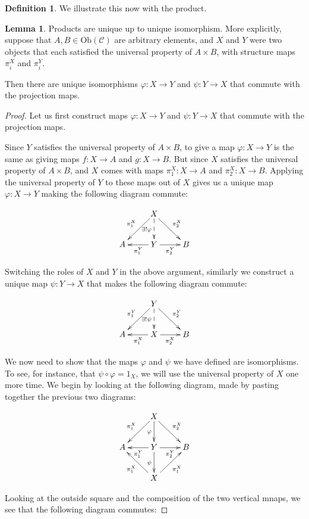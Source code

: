\documentclass{amsart}
\theoremstyle{definition}
\newtheorem{lemma}[dummy]{Lemma}
\newtheorem{definition}[dummy]{Definition}
\begin{document}
\begin{definition}
We illustrate this now with the product.

\begin{lemma}
Products are unique up to unique isomorphism. More explicitly, suppose that $A, B\in\textrm{Ob}(\mathcal{C})$ are arbitrary elements, and $X$ and $Y$ were two objects that each satisfied the universal property of $A\times B$, with structure maps $\pi_i^X$ and $\pi_i^Y$.  

  Then there are unique isomorphisms $\varphi:X\to Y$ and $\psi:Y\to X$ that commute with the projection maps.
\end{lemma}
\begin{proof}

Let us first construct maps $\varphi:X\to Y$ and $\psi:Y\to X$ that commute with the projection maps.

Since $Y$ satisfies the universal property of $A\times B$, to give a map $\varphi:X\to Y$ is the same as giving maps $f:X\to A$ and $g:X\to B$.  But since $X$ satisfies the universal property of $A\times B$, and $X$ comes with maps $\pi_1^X:X\to A$ and $\pi_2^X:X\to B$.  Applying the universal property of $Y$ to these maps out of $X$ gives us a unique map $\varphi:X\to Y$ making the following diagram commute:

$$\xymatrix{
& X \ar[dl]_{\pi_1^X} \ar@{-->}[d]_{\exists !\varphi} \ar[dr]^{\pi_2^X} \\
A & Y \ar[l]^{\pi^Y_1} \ar[r]_{\pi^Y_2} & B}$$

Switching the roles of $X$ and $Y$ in the above argument, similarly we construct a unique map $\psi:Y\to X$ that makes the following diagram commute:

$$\xymatrix{
& Y \ar[dl]_{\pi_1^Y} \ar@{-->}[d]_{\exists !\psi} \ar[dr]^{\pi_2^Y} \\
A & X \ar[l]^{\pi^X_1} \ar[r]_{\pi^X_2} & B}$$


We now need to show that the maps $\varphi$ and $\psi$ we have defined are isomorphisms.  To see, for instance, that $\psi\circ\varphi=1_X$, we will use the universal property of $X$ one more time.  We begin by looking at the following diagram, made by pasting together the previous two diagrams:

$$\xymatrix{
& X \ar[dl]_{\pi_1^X} \ar[d]_{\varphi} \ar[dr]^{\pi_2^X} & \\
A & Y \ar[l]^{\pi^Y_1} \ar[r]_{\pi^Y_2} \ar[d]_{\psi} & B \\
& X \ar[ul]^{\pi_1^X} \ar[ur]_{\pi_1^X} &}$$

Looking at the outside square and the composition of the two vertical mnaps, we see that the following diagram commutes:


\end{proof}
\end{definition}
\end{document}
